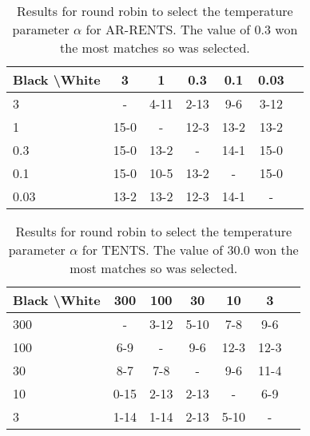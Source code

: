     \begin{table*}[]
    \centering
        \begin{tabular}{l|cccccc}
            \textbf{Black \textbackslash White}     & 3  & 1   & 0.3   & 0.1    & 0.03    \\ 
            \hline
                                    3            & -     	&  4-11 		&  2-13 		& 9-6  		& 3-12  		\\
                                    1            &  15-0 		& -     	&  12-3		& 13-2  		&   13-2		\\
                                    0.3          &  15-0  	&  13-2  	&   -   &  14-1 		&  15-0 		\\
                                    0.1          &  15-0 		&   10-5		&   13-2		& -     	&  15-0 		\\
                                    0.03         &  13-2 		&  13-2 		&  12-3 		&   	14-1	&   -   	\\    
        \end{tabular}
        \caption{Results for round robin to select the temperature parameter $\alpha$ for AR-RENTS. The value of 0.3 won the most matches so was selected. \label{tab:x050}}
    \end{table*}
    
    \begin{table*}[]
    \centering
        \begin{tabular}{l|cccccc}
            \textbf{Black \textbackslash White}     & 300  & 100   & 30   & 10    & 3    \\ 
            \hline
                                    300            & -     	&  3-12 		&  5-10 		&  7-8 		& 9-6  		\\
                                    100            &  6-9 		& -     	&  9-6		&  12-3 		& 12-3  		\\
                                    30          & 8-7   	&  7-8  	&   -   &  9-6 		&  11-4 		\\
                                    10          &  0-15 		&  2-13 		& 2-13  		& -     	& 6-9  		\\
                                    3         &  1-14 		& 1-14  		& 2-13  		&  5-10 		&   -   	\\    
        \end{tabular}
        \caption{Results for round robin to select the temperature parameter $\alpha$ for TENTS. The value of 30.0 won the most matches so was selected. \label{tab:w060}}
    \end{table*}
    
